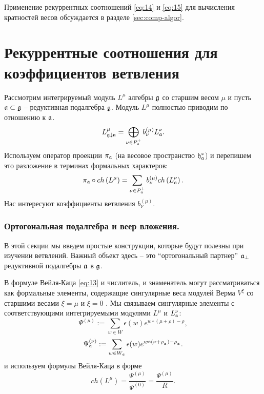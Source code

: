 Применение рекуррентных соотношений \eqref{eq:14} и \eqref{eq:15} для вычисления кратностей весов обсуждается в разделе \ref{sec:comp-algor}. 

\section{Рекуррентные соотношения для коэффициентов ветвления}
\label{sec:branching}

Рассмотрим интегрируемый модуль $L^{\mu }$ алгебры $\mathfrak{g}$ со старшим весом  $\mu$ и пусть  $\mathfrak{a}\subset\mathfrak{g}$ -- редуктивная подалгебра $\mathfrak{g}$. Модуль $L^{\mu}$ полностью приводим по отношению к $\mathfrak{a}$.
\begin{equation*}
 L_{\mathfrak{g}\downarrow \mathfrak{a}}^{\mu }=\bigoplus
\limits_{\nu \in P_{\mathfrak{a}}^{+}}b_{\nu }^{\left( \mu \right) }L_{\mathfrak{a}}^{\nu }.
\end{equation*}
Используем оператор проекции  $\pi_{\mathfrak{a}}$ (на весовое пространство $\mathfrak{h}_{\mathfrak{a}}^*$) и перепишем это разложение в терминах формальных характеров:
\begin{equation}
\label{branching1}
 \pi _{\mathfrak{a}}\circ ch\left( L^{\mu }\right)
 =\sum_{\nu \in P_{\mathfrak{a}}^{+}}b_{\nu }^{(\mu)}ch\left( L_{\mathfrak{a}}^{\nu }\right) .
\end{equation}
Нас интересуют коэффициенты ветвления $b^{(\mu)}_{\nu}$.

\subsubsection{Ортогональная подалгебра и веер вложения.}
\label{subsec:branching-orthog-pair}

В этой секции мы введем простые конструкции, которые будут полезны при изучении ветвлений. Важный объект здесь -- это ``ортогональный партнер''  $\mathfrak{a}_{\perp}$ редуктивной подалгебры $\mathfrak{a}$ в  $\mathfrak{g}$.

В формуле Вейля-Каца \eqref{eq:13} и числитель, и знаменатель могут рассматриваться как формальные элементы, содержащие сингулярные веса модулей Верма $V^{\xi}$ со старшими весами  $\xi=\mu$ и $\xi=0$ \cite{humphreys1997introduction}.
Мы связываем сингулярные элементы с соответствующими интегрируемыми модулями  $L^{\mu }$ и $L_{\mathfrak{a}}^{\nu }$:
\begin{equation*}
\Psi ^{\left( \mu \right) }:=\sum\limits_{w\in W}\epsilon (w)e^{w\circ (\mu +\rho )-\rho },
\end{equation*}
\begin{equation*}
\Psi _{ \mathfrak{a}}^{\left( \nu \right) }:= \sum\limits_{w\in W_{\mathfrak{a}}}\epsilon (w)e^{w\circ (\nu +\rho_{_{\mathfrak{a}}})-\rho _{_{\mathfrak{a}}}}.
\end{equation*}
и используем формулы Вейля-Каца в форме
\begin{equation}
\label{Weyl-Kac2}
ch\left( L^{\mu }\right) =\frac{\Psi ^{\left( \mu \right) }}{\Psi ^{\left( 0 \right) }}=\frac{\Psi ^{\left( \mu \right) }}{R}.
\end{equation}

